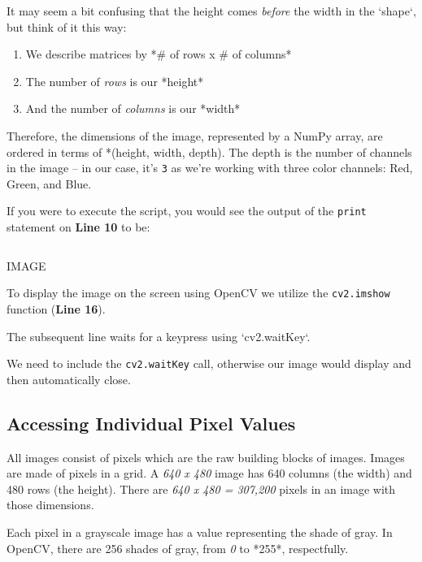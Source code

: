 It may seem a bit confusing that the height comes \textit{before} the width in the `shape`, but think of it this way:

\begin{enumerate}
    \item We describe matrices by *# of rows x # of columns*
    \item The number of \textit{rows} is our *height*
    \item And the number of \textit{columns} is our *width*
\end{enumerate}

Therefore, the dimensions of the image, represented by a NumPy array, are ordered in terms of *(height, width, depth). The depth is the number of channels in the image -- in our case, it’s \texttt{3} as we’re working with three color channels: Red, Green, and Blue.

If you were to execute the script, you would see the output of the \texttt{print} statement on \textbf{Line 10} to be:

\begin{verbatim}

\end{verbatim}

IMAGE

To display the image on the screen using OpenCV we utilize the \texttt{cv2.imshow} function (\textbf{Line 16}).

The subsequent line waits for a keypress using `cv2.waitKey`.

We need to include the \texttt{cv2.waitKey} call, otherwise our image would display and then automatically close.


\subsection{Accessing Individual Pixel Values}

All images consist of pixels which are the raw building blocks of images. Images are made of pixels in a grid. A \textit{640 x 480} image has 640 columns (the width) and 480 rows (the height). There are \textit{640 x 480 = 307,200} pixels in an image with those dimensions.

Each pixel in a grayscale image has a value representing the shade of gray. In OpenCV, there are 256 shades of gray, from \textit{0} to *255*, respectfully.

